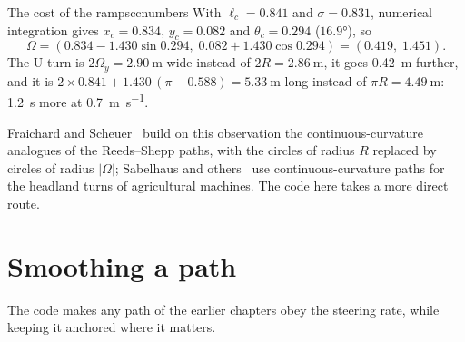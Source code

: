 \begin{example}{The cost of the ramps}{ccnumbers}
  With $\ell_c = 0.841$ and $\sigma = 0.831$, numerical integration gives
  $x_c = 0.834$, $y_c = 0.082$ and $\theta_c = 0.294$ ($16.9°$), so
  \[
    \Omega = (0.834 - 1.430 \sin 0.294,\; 0.082 + 1.430 \cos 0.294) =
    (0.419,\; 1.451).
  \]
  The U-turn is $2\Omega_y = \SI{2.90}{\metre}$ wide instead of $2R =
  \SI{2.86}{\metre}$, it goes \SI{0.42}{\metre} further, and it is
  $2 \times 0.841 + 1.430\,(\pi - 0.588) = \SI{5.33}{\metre}$ long instead
  of $\pi R = \SI{4.49}{\metre}$: \SI{1.2}{\second} more at
  \SI{0.7}{\metre\per\second}.
\end{example}

Fraichard and Scheuer~\cite{fraichard2004reeds} build on this observation
the continuous-curvature analogues of the Reeds--Shepp paths, with the
circles of radius $R$ replaced by circles of radius $|\Omega|$; Sabelhaus
and others~\cite{sabelhaus2013using} use continuous-curvature paths for the
headland turns of agricultural machines. The code here takes a more direct
route.

\section{Smoothing a path}

The code makes any path of the earlier chapters obey the steering rate,
while keeping it anchored where it matters.

